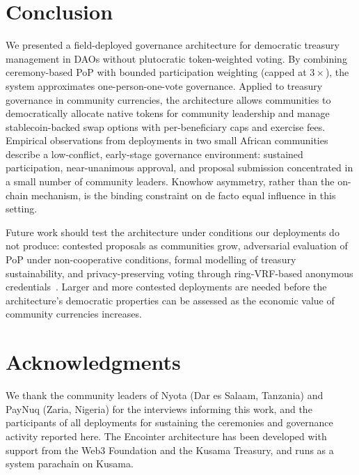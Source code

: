 \documentclass{svproc}
\newcommand{\projname}{Encointer\xspace}
\newcommand{\projrelaychain}{Kusama\xspace}
\newcommand{\locationC}{Dar es Salaam, Tanzania\xspace}
\newcommand{\locationD}{Zaria, Nigeria\xspace}
\begin{document}
\section{Conclusion}
\label{sec:conclusion}

We presented a field-deployed governance architecture for democratic treasury management in DAOs without plutocratic token-weighted voting.
By combining ceremony-based PoP with bounded participation weighting (capped at $3\times$), the system approximates one-person-one-vote governance.
Applied to treasury governance in community currencies, the architecture allows communities to democratically allocate native tokens for community leadership and manage stablecoin-backed swap options with per-beneficiary caps and exercise fees.
Empirical observations from deployments in two small African communities describe a low-conflict, early-stage governance environment: sustained participation, near-unanimous approval, and proposal submission concentrated in a small number of community leaders.
Knowhow asymmetry, rather than the on-chain mechanism, is the binding constraint on de facto equal influence in this setting.

Future work should test the architecture under conditions our deployments do not produce: contested proposals as communities grow, adversarial evaluation of PoP under non-cooperative conditions, formal modelling of treasury sustainability, and privacy-preserving voting through ring-VRF-based anonymous credentials~\cite{burdges2023ringvrf}.
Larger and more contested deployments are needed before the architecture's democratic properties can be assessed as the economic value of community currencies increases.

\section*{Acknowledgments}

We thank the community leaders of Nyota (\locationC) and PayNuq (\locationD) for the interviews informing this work, and the participants of all deployments for sustaining the ceremonies and governance activity reported here. The \projname architecture has been developed with support from the Web3 Foundation and the Kusama Treasury, and runs as a system parachain on \projrelaychain.
\end{document}
